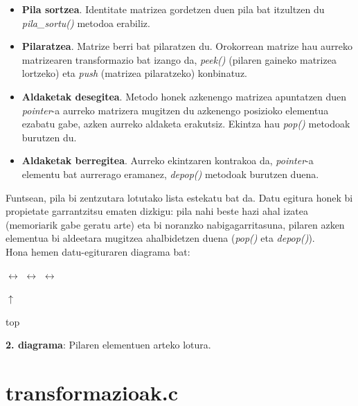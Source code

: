 \documentclass[12pt]{article}
\newcommand{\metodo}[1] {\textit{#1}}
\begin{document}
\begin{itemize}
\item \textbf{Pila sortzea}. Identitate matrizea gordetzen duen pila bat itzultzen du \metodo{pila\_sortu()} metodoa erabiliz.

\item \textbf{Pilaratzea}. Matrize berri bat pilaratzen du. Orokorrean matrize hau aurreko matrizearen transformazio bat izango da, \metodo{peek()} (pilaren gaineko matrizea lortzeko) eta \metodo{push} (matrizea pilaratzeko) konbinatuz.

\item \textbf{Aldaketak desegitea}. Metodo honek azkenengo matrizea apuntatzen duen \textit{pointer}-a\cite{pointer} aurreko matrizera mugitzen du azkenengo posizioko elementua ezabatu gabe, azken aurreko aldaketa erakutsiz. Ekintza hau \metodo{pop()} metodoak burutzen du.

\item \textbf{Aldaketak berregitea}. Aurreko ekintzaren kontrakoa da, \textit{pointer}-a elementu bat aurrerago eramanez, \metodo{depop()} metodoak burutzen duena. 
\end{itemize}

Funtsean, pila bi zentzutara lotutako lista estekatu bat da. Datu egitura honek bi propietate garrantzitsu ematen dizkigu: pila nahi beste hazi ahal izatea (memoriarik gabe geratu arte) eta bi noranzko nabigagarritasuna, pilaren azken elementua bi aldeetara mugitzea ahalbidetzen duena (\metodo{pop()} eta \metodo{depop()}).\\
Hona hemen datu-egituraren diagrama bat:

\begin{center}

 $\leftrightarrow$  $\leftrightarrow$  $\leftrightarrow$ 

\hspace{5.5cm} $\uparrow$

\hspace{5.5cm} top

\textbf{2. diagrama}: Pilaren elementuen arteko lotura.
\end{center}


\section{transformazioak.c}\label{transformazioak}
\end{document}
